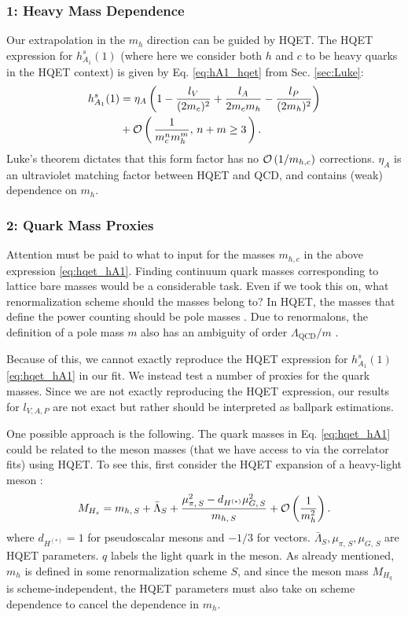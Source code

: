 \subsubsection{1: Heavy Mass Dependence}
\label{sec:BsDsstar_heavymass}

Our extrapolation in the $m_h$ direction can be guided by HQET. The HQET expression for $h^s_{A_1}(1)$ (where here we consider both $h$ and $c$ to be heavy quarks in the HQET context) is given by Eq. \eqref{eq:hA1_hqet} from Sec. \ref{sec:Luke}:
\begin{align}
  \label{eq:hqet_hA1}
  h^s_{A_1}(1) &= \eta_A \left( 1 - {l_V\over (2m_c)^2} + {l_A \over 2 m_c m_h} - { l_P \over (2m_h)^2 } \right)  \\ \nonumber &+ \mathcal{O}\left( \, {1\over m_c^n m_h^m}, \, n+m\geq 3 \, \right).
\end{align}
Luke's theorem dictates that this form factor has no $\mathcal{O}\left( 1/m_{h,c} \right)$ corrections. $\eta_A$ is an ultraviolet matching factor between HQET and QCD, and contains (weak) dependence on $m_h$.

\subsubsection{2: Quark Mass Proxies}
\label{sec:massambiguities}

Attention must be paid to what to input for the masses $m_{h,c}$ in the above expression \eqref{eq:hqet_hA1}. Finding continuum quark masses corresponding to lattice bare masses would be a considerable task. Even if we took this on, what renormalization scheme should the masses belong to? In HQET, the masses that define the power counting should be pole masses \cite{Neubert:1997gu}. Due to renormalons, the definition of a pole mass $m$ also has an ambiguity of order $\Lambda_{\text{QCD}}/m$ \cite{tHooft1979}.

Because of this, we cannot exactly reproduce the HQET expression for $h_{A_1}^s(1)$ \eqref{eq:hqet_hA1} in our fit. We instead test a number of proxies for the quark masses. Since we are not exactly reproducing the HQET expression, our results for $l_{V,A,P}$ are not exact but rather should be interpreted as ballpark estimations.

One possible approach is the following. The quark masses in Eq. \eqref{eq:hqet_hA1} could be related to the meson masses (that we have access to via the correlator fits) using HQET. To see this, first consider the HQET expansion of a heavy-light meson \cite{Bazavov:2018omf}:
\begin{align}
  \label{eq:hqet_mass}
  M_{H_s} = m_{h,\,S} + \bar{\Lambda}_S + { \mu^2_{\pi,\,S} - d_{H^{(*)}} \mu^2_{G,\,S} \over m_{h,\,S}} + \mathcal{O}\left({1\over m_h^2}\right).
\end{align}
where $d_{H^{(*)}} = 1$ for pseudoscalar mesons and $-1/3$ for vectors. $\bar{\Lambda}_S,\mu_{\pi,\,S},\mu_{G,\,S}$ are HQET parameters. $q$ labels the light quark in the meson. As already mentioned, $m_h$ is defined in some renormalization scheme $S$, and since the meson mass $M_{H_q}$ is scheme-independent, the HQET parameters must also take on scheme dependence to cancel the dependence in $m_h$.

